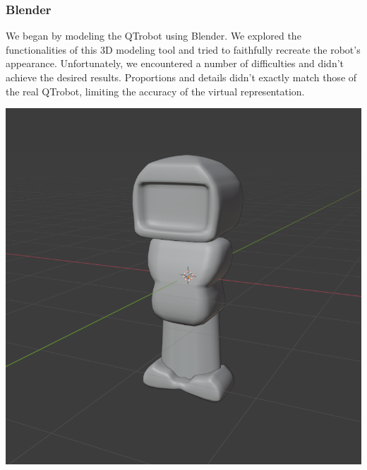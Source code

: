\subsubsection{Blender}
\begin{minipage}{.5\textwidth}%
We began by modeling the QTrobot using Blender. We explored the functionalities of this 3D modeling tool and tried to faithfully recreate the robot's appearance. Unfortunately, we encountered a number of difficulties and didn't achieve the desired results. Proportions and details didn't exactly match those of the real QTrobot, limiting the accuracy of the virtual representation.\\
\end{minipage}%
\hfill
\begin{minipage}{.35\textwidth}%
\includegraphics[width=\textwidth]{Figures/QT3D_blender.png}
\end{minipage}%
\\
